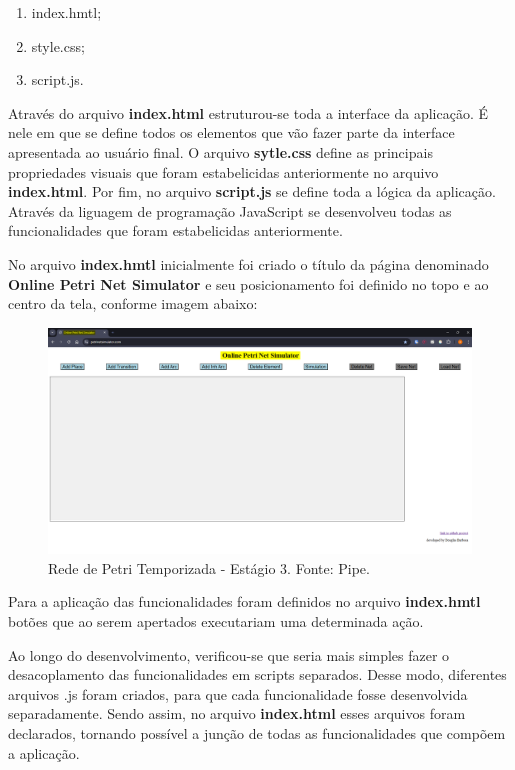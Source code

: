 \documentclass[
	12pt,				%
	openright,			%
	oneside,			%
	a4paper,			%
	english,			%
	brazil				%
	]{abntex2}
\begin{document}
\begin{enumerate}
	\item index.hmtl;
	\item style.css;
	\item script.js.
\end{enumerate}

Através do arquivo \textbf{index.html} estruturou-se toda a interface da aplicação. É nele em que se define todos os elementos que vão fazer parte da interface apresentada ao usuário final. O arquivo \textbf{sytle.css} define as principais propriedades visuais que foram estabelicidas anteriormente no arquivo \textbf{index.html}. Por fim, no arquivo \textbf{script.js} se define toda a lógica da aplicação. Através da liguagem de programação JavaScript se desenvolveu todas as funcionalidades que foram estabelicidas anteriormente. 

No arquivo \textbf{index.hmtl} inicialmente foi criado o título da página denominado \textbf{Online Petri Net Simulator} e seu posicionamento foi definido no topo e ao centro da tela, conforme imagem abaixo:

\begin{figure}[ht] 
	\centering
	\includegraphics[scale=0.3]{figuras/tela_inicial_titulo_topo_centro.png}
	\caption[Título no topo e ao centro]{Rede de Petri Temporizada - Estágio 3. Fonte: Pipe.}
	\label{fig:titulo_topo_centro}
\end{figure}

Para a aplicação das funcionalidades foram definidos no arquivo  \textbf{index.hmtl} botões que ao serem apertados executariam uma determinada ação. 

Ao longo do desenvolvimento, verificou-se que seria mais simples fazer o desacoplamento das funcionalidades em scripts separados. Desse modo, diferentes arquivos .js foram criados, para que cada funcionalidade fosse desenvolvida separadamente. Sendo assim, no arquivo \textbf{index.html} esses arquivos foram declarados, tornando possível a junção de todas as funcionalidades que compõem a aplicação. 
\end{document}
